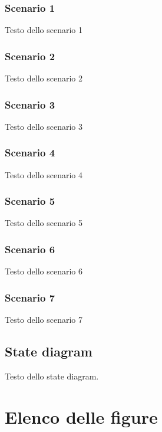 \documentclass[12pt]{article}
\begin{document}
\subsubsection{Scenario 1}
Testo dello scenario 1
\subsubsection{Scenario 2}
Testo dello scenario 2
\subsubsection{Scenario 3}
Testo dello scenario 3
\subsubsection{Scenario 4}
Testo dello scenario 4
\subsubsection{Scenario 5}
Testo dello scenario 5
\subsubsection{Scenario 6}
Testo dello scenario 6
\subsubsection{Scenario 7}
Testo dello scenario 7

\subsection{State diagram}
Testo dello state diagram.

\section*{Elenco delle figure}
\end{document}
